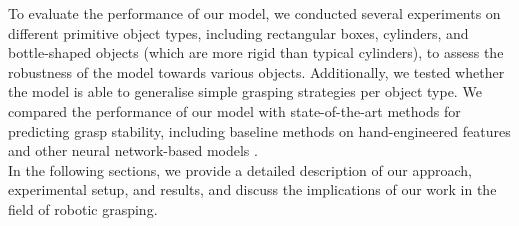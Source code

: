 \documentclass[11pt, a4paper]{report}
\begin{document}
To evaluate the performance of our model, we conducted several experiments on different primitive object types, including rectangular boxes, cylinders, and bottle-shaped objects (which are more rigid than typical cylinders), to assess the robustness of the model towards various objects. Additionally, we tested whether the model is able to generalise simple grasping strategies per object type. We compared the performance of our model with state-of-the-art methods for predicting grasp stability, including baseline methods on hand-engineered features and other neural network-based models \cite{mahler2017dexnet, pinto2015supersizing}.\\

In the following sections, we provide a detailed description of our approach, experimental setup, and results, and discuss the implications of our work in the field of robotic grasping.
\end{document}

